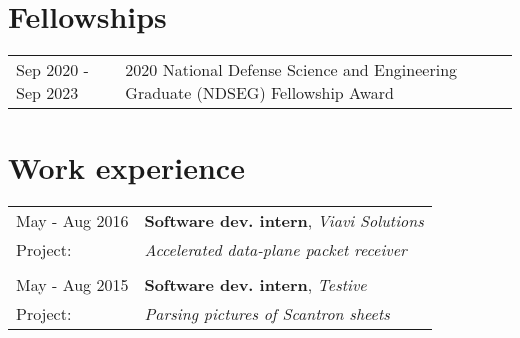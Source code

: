 \documentclass[a4paper,12pt]{article}
\begin{document}
\section{Fellowships}

\begin{tabularx}{\linewidth}{ @{}l X@{} }
  Sep 2020 - Sep 2023 & 2020 National Defense Science and Engineering Graduate (NDSEG) Fellowship Award
\end{tabularx}

\section{Work experience}
\begin{tabularx}{\linewidth}{ @{}l X@{} }
  May - Aug 2016 & \textbf{Software dev. intern}, \emph{Viavi Solutions} \\[3.75pt]
  Project: & \emph{Accelerated data-plane packet receiver} \\ \\ 
  May - Aug 2015 & \textbf{Software dev. intern}, \emph{Testive} \\[3.75pt]
  Project: & \emph{Parsing pictures of Scantron sheets} 
\end{tabularx}

\end{document}
